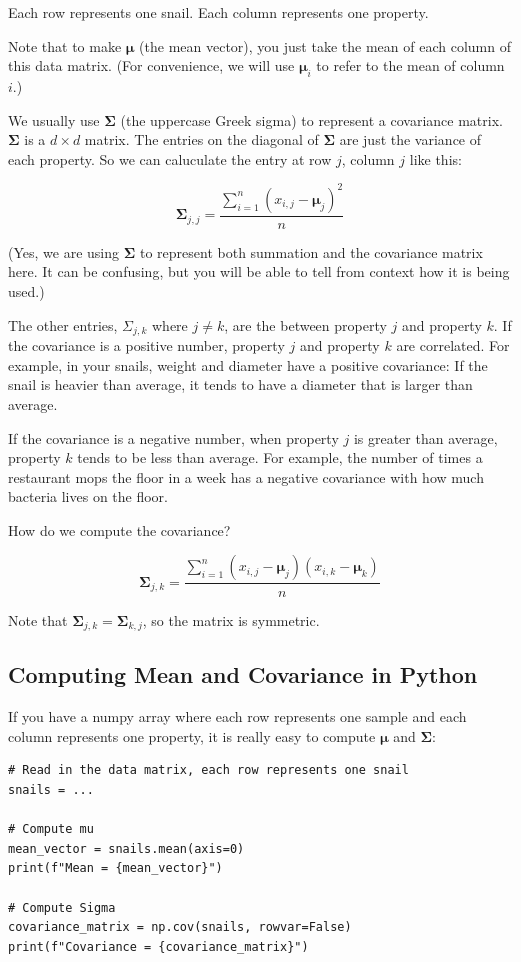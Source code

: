 Each row represents one snail. Each column represents one property.

Note that to make $\boldsymbol\mu$ (the mean vector), you just take the mean of each column of this data matrix. (For convenience, we will use $\boldsymbol\mu_i$ to refer to the mean of column $i$.)

We usually use $\mathbf{\Sigma}$ (the uppercase Greek sigma) to represent a covariance matrix. $\mathbf{\Sigma}$ is a $d \times d$ matrix.
The entries on the diagonal of $\mathbf{\Sigma}$ are just the variance of each property.
So we can caluculate the entry at row $j$, column $j$ like this:

$$\mathbf{\Sigma}_{j,j} = \frac{\sum_{i=1}^{n}(x_{i,j} - \boldsymbol\mu_j)^2}{n}$$

(Yes, we are using $\mathbf{\Sigma}$ to represent both summation and the covariance matrix here.
It can be confusing, but you will be able to tell from context how it is being used.)

The other entries, $\Sigma_{j,k}$ where $j \neq k$, are the  between property $j$ and property $k$.
If the covariance is a positive number, property $j$ and property $k$ are correlated. For example, in your snails, weight and diameter have a positive covariance: If the snail is heavier than average, it tends to have a diameter that is larger than average.

If the covariance is a negative number, when property $j$ is greater than average, property $k$ tends to be less than average.
For example, the number of times a restaurant mops the floor in a week has a negative covariance with how much bacteria lives on the floor.

How do we compute the covariance?

$$\mathbf{\Sigma}_{j,k} = \frac{\sum_{i=1}^{n}(x_{i,j} - \boldsymbol\mu_j)(x_{i,k} - \boldsymbol\mu_k)}{n}$$

Note that $\mathbf{\Sigma}_{j,k} = \mathbf{\Sigma}_{k,j}$, so the matrix is symmetric.

\subsection{Computing Mean and Covariance in Python}

If you have a numpy array where each row represents one sample and each column represents one property, it is really easy to compute $\boldsymbol\mu$ and $\mathbf{\Sigma}$:

\begin{verbatim}
# Read in the data matrix, each row represents one snail
snails = ...

# Compute mu
mean_vector = snails.mean(axis=0)
print(f"Mean = {mean_vector}")

# Compute Sigma
covariance_matrix = np.cov(snails, rowvar=False)
print(f"Covariance = {covariance_matrix}")
\end{verbatim}

